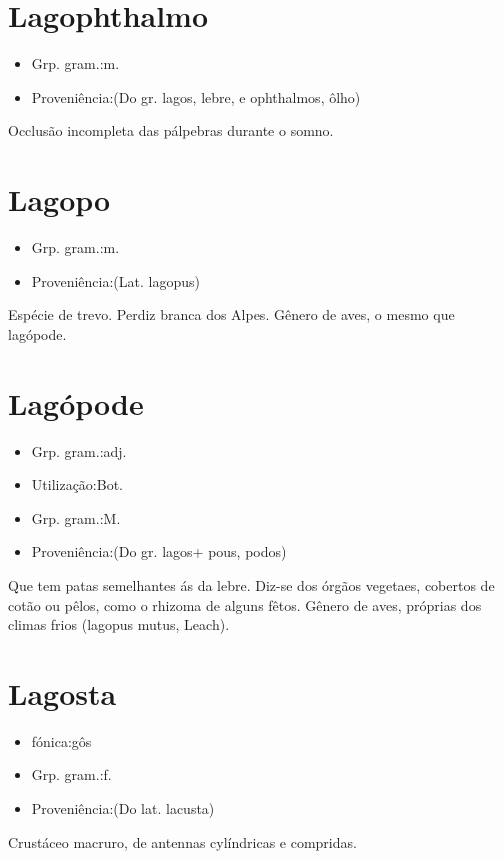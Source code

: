 \section{Lagophthalmo}
\begin{itemize}
\item {Grp. gram.:m.}
\end{itemize}
\begin{itemize}
\item {Proveniência:(Do gr. \textunderscore lagos\textunderscore , lebre, e \textunderscore ophthalmos\textunderscore , ôlho)}
\end{itemize}
Occlusão incompleta das pálpebras durante o somno.
\section{Lagopo}
\begin{itemize}
\item {Grp. gram.:m.}
\end{itemize}
\begin{itemize}
\item {Proveniência:(Lat. \textunderscore lagopus\textunderscore )}
\end{itemize}
Espécie de trevo.
Perdiz branca dos Alpes.
Gênero de aves, o mesmo que \textunderscore lagópode\textunderscore .
\section{Lagópode}
\begin{itemize}
\item {Grp. gram.:adj.}
\end{itemize}
\begin{itemize}
\item {Utilização:Bot.}
\end{itemize}
\begin{itemize}
\item {Grp. gram.:M.}
\end{itemize}
\begin{itemize}
\item {Proveniência:(Do gr. \textunderscore lagos\textunderscore  + \textunderscore pous\textunderscore , \textunderscore podos\textunderscore )}
\end{itemize}
Que tem patas semelhantes ás da lebre.
Diz-se dos órgãos vegetaes, cobertos de cotão ou pêlos, como o rhizoma de alguns fêtos.
Gênero de aves, próprias dos climas frios (\textunderscore lagopus mutus\textunderscore , Leach).
\section{Lagosta}
\begin{itemize}
\item {fónica:gôs}
\end{itemize}
\begin{itemize}
\item {Grp. gram.:f.}
\end{itemize}
\begin{itemize}
\item {Proveniência:(Do lat. \textunderscore lacusta\textunderscore )}
\end{itemize}
Crustáceo macruro, de antennas cylíndricas e compridas.

